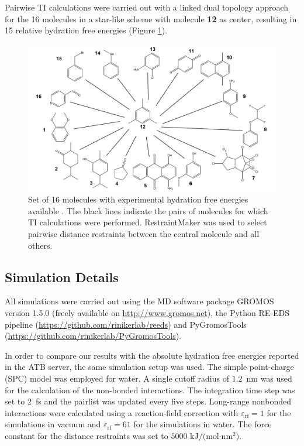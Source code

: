 Pairwise TI calculations were carried out with a linked dual topology approach for the 16 molecules in a star-like scheme with molecule \textbf{12} as center, resulting in 15 relative hydration free energies (Figure \ref{fig: Pairwise_TI_M030_Graph}).
\begin{figure}[h]
    \centering
    \includegraphics[width=\textwidth]{fig/methods/StateGraph_TI_2D_enumerated.png}
    \caption{Set of 16 molecules with experimental hydration free energies available \cite{Stroet2018,Wolfenden1987,Rizzo2006,Nicholls2008,Guthrie2009,Guthrie2014,Mobley2014}. The black lines indicate the pairs of molecules for which TI calculations were performed. RestraintMaker was used to select pairwise distance restraints between the central molecule and all others.} 
    \label{fig: Pairwise_TI_M030_Graph}
\end{figure}

\subsection{Simulation Details}
All simulations were carried out using the MD software package GROMOS\cite{Schmid2012} version 1.5.0 (freely available on \url{http://www.gromos.net}),\cite{Ries2021B} the Python RE-EDS pipeline (\url{https://github.com/rinikerlab/reeds}) 
and PyGromosTools\cite{Lehner2021} (\url{https://github.com/rinikerlab/PyGromosTools}). 

In order to compare our results with the absolute hydration free energies reported in the ATB server,\cite{Stroet2018} the same simulation setup was used.
The simple point-charge (SPC) model\cite{Berendsen1981} was employed for water. A single cutoff radius of $1.2$~nm was used for the calculation of the non-bonded interactions. The integration time step was set to $2$~fs and the pairlist was updated every five steps. Long-range nonbonded interactions were calculated using a reaction-field correction\cite{Tironi1995} with $\varepsilon_{\text{rf}}=1$ for the simulations in vacuum and $\varepsilon_{\text{rf}}=61$ for the simulations in water.\cite{Heinz2001} The force constant for the distance restraints was set to $5000$ kJ$/($mol$\cdot$nm$^2)$.

